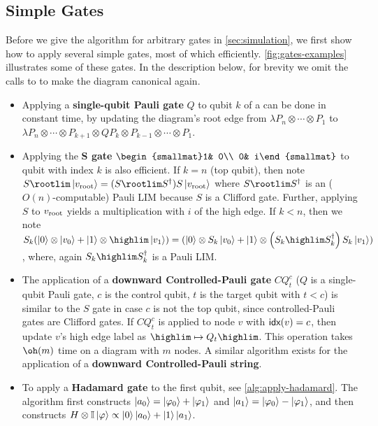 \subsection{Simple Gates}
\label{sec:simple-gates}
Before we give the algorithm for arbitrary gates in \autoref{sec:simulation}, we first show how to apply several simple gates, most of which efficiently.
\autoref{fig:gates-examples} illustrates some of these gates.
In the description below, for brevity we omit the calls to \makeedge to make the diagram canonical again.
\begin{itemize}
    \item Applying a \textbf{single-qubit Pauli gate} $Q$ to qubit $k$ of a \limdd can be done in constant time, by updating the diagram's root edge from $\lambda P_n\otimes\cdots\otimes P_1$ to $\lambda P_n\otimes\cdots\otimes P_{k+1}\otimes QP_k\otimes P_{k-1}\otimes\cdots\otimes P_1$.
    \item Applying the \textbf{S gate} $\begin{smallmat}1& 0\\ 0& i\end{smallmat}$ to qubit with index $k$ is also efficient.
            If $k=n$ (top qubit), then note $S \rootlim \ket{v_{\textnormal{root}}} = (S \rootlim S^{\dagger}) S \ket{v_{\textnormal{root}}}$ where $S \rootlim S^{\dagger}$ is an ($O(n)$-computable) Pauli LIM because $S$ is a Clifford gate.
            Further, applying $S$ to $v_{\textnormal{root}}$ yields a multiplication with $i$ of the high edge.
            If $k<n$, then we note $S_k(\ket{0} \otimes \ket{v_0} + \ket{1} \otimes \highlim \ket{v_1}) = (\ket{0} \otimes S_k\ket{v_0} + \ket{1} \otimes \left(S_k\highlim S_k^{\dagger}\right) S_k \ket{v_1})$, where, again $S_k \highlim S_k^{\dagger}$ is a Pauli LIM.
        \item The application of a \textbf{downward Controlled-Pauli gate} $CQ_{t}^c$ ($Q$ is a single-qubit Pauli gate, $c$ is the control qubit, $t$ is the target qubit with $t<c$) is similar to the $S$ gate in case $c$ is not the top qubit, since controlled-Pauli gates are Clifford gates.
            If $CQ_{t}^c$ is applied to node $v$ with $\textsf{idx}(v)=c$, then update $v$'s high edge label as $\highlim \mapsto Q_t \highlim$.
    This operation takes $\oh(m)$ time on a diagram with $m$ nodes. A similar algorithm exists for the application of a \textbf{downward Controlled-Pauli string}.
\item To apply a \textbf{Hadamard gate} to the first qubit, see \autoref{alg:apply-hadamard}.
    The algorithm first constructs $\ket{a_0}=\ket{\varphi_0}+\ket{\varphi_1}$ and $\ket{a_1}=\ket{\varphi_0} - \ket{\varphi_1}$, and then constructs $H\otimes \mathbb I\ket{\varphi} \propto \ket 0\ket{a_0} + \ket 1\ket{a_1}$.

\end{itemize}
